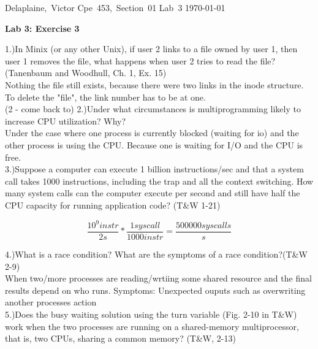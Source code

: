 \documentclass[11pt]{article}
\begin{document}
\hfill\vbox{\hbox{Delaplaine, Victor}
		\hbox{Cpe 453, Section 01}	
		\hbox{Lab 3}	
		\hbox{\today}}\par

\bigskip
\centerline{\Large\bf Lab 3: Exercise 3}\par
\bigskip 



1.)In Minix (or any other Unix), if user 2 links to a file owned by user 1, then user 1 removes
the file, what happens when user 2 tries to read the file? (Tanenbaum and Woodhull, Ch. 1,
Ex. 15) \\
 
	Nothing the file still exists, because there were two links in the inode structure. 
To delete the "file", the link number has to be at one. \\


(2 - come back to)
2.)Under what circumstances is multiprogramming likely to increase CPU utilization? Why?\\

	Under the case where one process is currently blocked (waiting for io) and the other process is using the CPU.
Because one is waiting for I/O and the CPU is free. \\


3.)Suppose a computer can execute 1 billion instructions/sec and that a system call takes 1000
instructions, including the trap and all the context switching. How many system calls can
the computer execute per second and still have half the CPU capacity for running application code? (T&W 1-21) \\

\begin{flushleft}
\[\frac{10^9instr}{2s}*\frac{1 syscall}{1000 instr}=\frac{500000syscalls}{s}\]
\end{flushleft}

4.)What is a race condition? What are the symptoms of a race condition?(T&W 2-9) \\ 


When two/more processes are reading/wrtiing some shared resource and the final results depend on who runs.
Symptoms: Unexpected ouputs such as overwriting another processes action \\


5.)Does the busy waiting solution using the turn variable (Fig. 2-10 in T&W) work when the
two processes are running on a shared-memory multiprocessor, that is, two CPUs, sharing a
common memory? (T&W, 2-13) \\
\end{document}
